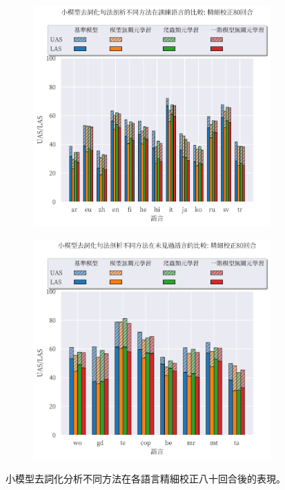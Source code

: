 \begin{figure}[!htbp]
    \centering
    \begin{subfigure}[t]{0.75\textwidth}
        \centering
        \includegraphics[width=\textwidth]{figs/chapter3/delex/bar_small_full_epoch_80_train_langs.pdf}
    \end{subfigure}
    \vspace{-12pt}
    \begin{subfigure}[t]{0.75\textwidth}
        \centering
        \includegraphics[width=\textwidth]{figs/chapter3/delex/bar_small_full_epoch_80_test_langs.pdf}
    \end{subfigure}
    \caption{小模型去詞化分析不同方法在各語言精細校正八十回合後的表現。}
    \label{fig:bar_small_full_epoch_80}
\end{figure}
